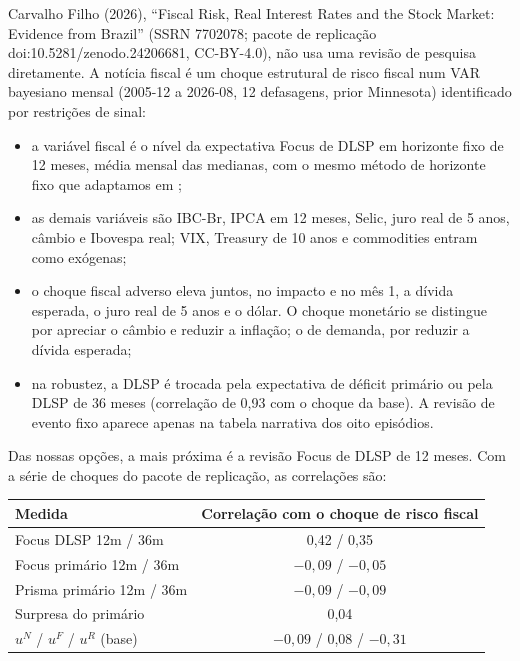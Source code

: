\documentclass[12pt,a4paper]{article}
\begin{document}
Carvalho Filho (2026), ``Fiscal Risk, Real Interest Rates and the Stock Market:
Evidence from Brazil'' (SSRN 7702078; pacote de replicação
doi:10.5281/zenodo.24206681, CC-BY-4.0), não usa uma revisão de pesquisa diretamente.
A notícia fiscal é um choque estrutural de risco fiscal num VAR bayesiano mensal
(2005-12 a 2026-08, 12 defasagens, prior Minnesota) identificado por restrições de
sinal:

\begin{itemize}[leftmargin=1.2cm]
    \item a variável fiscal é o nível da expectativa Focus de DLSP em horizonte fixo
    de 12 meses, média mensal das medianas, com o mesmo método de horizonte fixo que
    adaptamos em ;
    \item as demais variáveis são IBC-Br, IPCA em 12 meses, Selic, juro real de 5
    anos, câmbio e Ibovespa real; VIX, Treasury de 10 anos e commodities entram como
    exógenas;
    \item o choque fiscal adverso eleva juntos, no impacto e no mês 1, a dívida
    esperada, o juro real de 5 anos e o dólar. O choque monetário se distingue por
    apreciar o câmbio e reduzir a inflação; o de demanda, por reduzir a dívida
    esperada;
    \item na robustez, a DLSP é trocada pela expectativa de déficit primário ou pela
    DLSP de 36 meses (correlação de 0,93 com o choque da base). A revisão de evento
    fixo aparece apenas na tabela narrativa dos oito episódios.
\end{itemize}

Das nossas opções, a mais próxima é a revisão Focus de DLSP de 12 meses. Com a série
de choques do pacote de replicação, as correlações são:

\begin{center}
\begin{tabular}{lc}
\toprule
Medida & Correlação com o choque de risco fiscal \\
\midrule
Focus DLSP 12m / 36m & 0,42 / 0,35 \\
Focus primário 12m / 36m & \(-0{,}09\) / \(-0{,}05\) \\
Prisma primário 12m / 36m & \(-0{,}09\) / \(-0{,}09\) \\
Surpresa do primário & 0,04 \\
\(u^N\) / \(u^F\) / \(u^R\) (base) & \(-0{,}09\) / 0,08 / \(-0{,}31\) \\
\bottomrule
\end{tabular}
\end{center}
\end{document}
